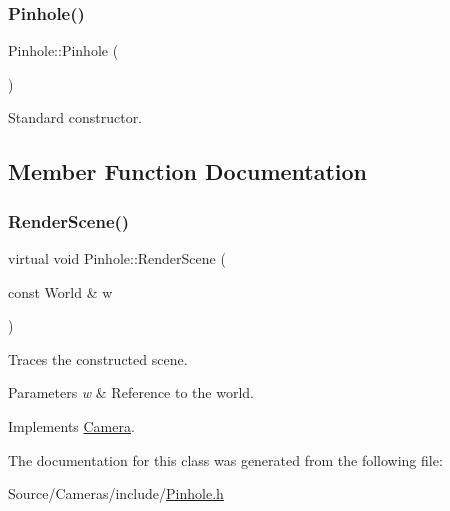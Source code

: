 \subsubsection{\texorpdfstring{Pinhole()}{Pinhole()}}
{\footnotesize\ttfamily Pinhole\+::\+Pinhole (\begin{DoxyParamCaption}{ }\end{DoxyParamCaption})}

Standard constructor. 

\subsection{Member Function Documentation}
\hypertarget{class_pinhole_a722af80f738cf4e8adba65926ffea9c9}{}\label{class_pinhole_a722af80f738cf4e8adba65926ffea9c9} 
\subsubsection{\texorpdfstring{Render\+Scene()}{RenderScene()}}
{\footnotesize\ttfamily virtual void Pinhole\+::\+Render\+Scene (\begin{DoxyParamCaption}\item[{const World \&}]{w }\end{DoxyParamCaption})\hspace{0.3cm}{\ttfamily [virtual]}}

Traces the constructed scene. 
\begin{DoxyParams}{Parameters}
{\em w} & Reference to the world. \\
\hline
\end{DoxyParams}


Implements \hyperlink{class_camera_ad65367e9b225387219d013ffed3f621a}{Camera}.



The documentation for this class was generated from the following file\+:\begin{DoxyCompactItemize}
\item 
Source/\+Cameras/include/\hyperlink{_pinhole_8h}{Pinhole.\+h}\end{DoxyCompactItemize}

